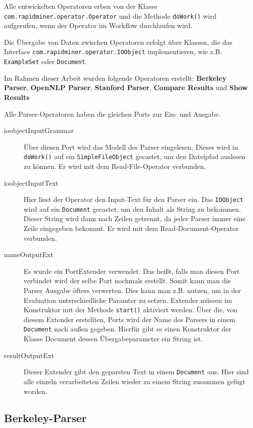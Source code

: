 Alle entwickelten Operatoren erben von der Klasse \texttt{com.rapidminer.operator.Operator} und die Methode \texttt{doWork()} wird aufgerufen, wenn der Operator im Workflow durchlaufen wird. 

Die Übergabe von Daten zwischen Operatoren erfolgt über Klassen, die das Interface \texttt{com.rapidminer.operator.IOObject} implementieren, wie z.B. \texttt{ExampleSet} oder \texttt{Document}. 

Im Rahmen dieser Arbeit wurden folgende Operatoren erstellt: \textbf{Berkeley Parser}, \textbf{OpenNLP Parser}, \textbf{Stanford Parser}, \textbf{Compare Results} und \textbf{Show Results}

Alle Parser-Operatoren haben die gleichen Ports zur Ein- und Ausgabe. 
\begin{description}
\item[ioobjectInputGrammar]
Über diesen Port wird das Modell des Parser eingelesen. Dieses wird in \texttt{doWork()} auf ein \texttt{SimpleFileObject} gecastet, um den Dateipfad auslesen zu können. Er wird mit dem Read-File-Operator verbunden.
\item[ioobjectInputText] Hier liest der Operator den Input-Text für den Parser ein. Das \texttt{IOObject} wird auf ein \texttt{Document} gecastet, um den Inhalt als String zu bekommen. Dieser String wird dann nach Zeilen getrennt, da jeder Parser immer eine Zeile eingegeben bekommt. Er wird mit dem Read-Document-Operator verbunden.
\item[nameOutputExt] Es wurde ein PortExtender verwendet. Das heißt, falls man diesen Port verbindet wird der selbe Port nochmals erstellt. Somit kann man die Parser Ausgabe öfters verwerten. Dies kann man z.B. nutzen, um in der Evaluation unterschiedliche Paramter zu setzen. Extender müssen im Konstruktor mit der Methode \texttt{start()} aktiviert werden. Über die, von diesem Extender erstellten, Ports wird der Name des Parsers in einem \texttt{Document} nach außen gegeben. Hierfür gibt es einen Konstruktor der Klasse Document dessen Übergabeparameter ein String ist. 
\item[resultOutputExt] Dieser Extender gibt den geparsten Text in einem \texttt{Document} aus. Hier sind alle einzeln verarbeiteten Zeilen wieder zu einem String zusammen gefügt worden.
\end{description}

\subsection{Berkeley-Parser}

